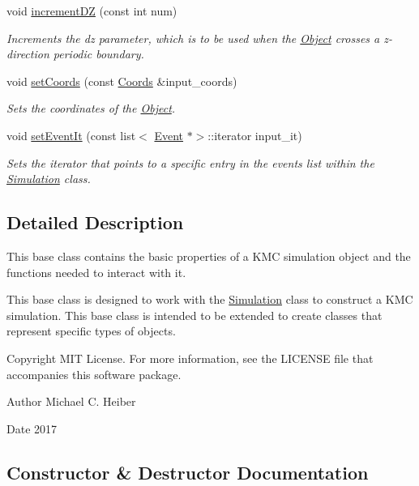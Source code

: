 \begin{DoxyCompactItemize}
void \hyperlink{class_object_a440b267c478f5d63db1954bdbd543408}{increment\+DZ} (const int num)
\begin{DoxyCompactList}\small\item\em Increments the dz parameter, which is to be used when the \hyperlink{class_object}{Object} crosses a z-\/direction periodic boundary. \end{DoxyCompactList}\item 
void \hyperlink{class_object_a34a164e4709e5daaba7a38c3d61ae617}{set\+Coords} (const \hyperlink{struct_coords}{Coords} \&input\+\_\+coords)
\begin{DoxyCompactList}\small\item\em Sets the coordinates of the \hyperlink{class_object}{Object}. \end{DoxyCompactList}\item 
void \hyperlink{class_object_ae39c4b0bd4e6a5f07f3d0e07e32061ec}{set\+Event\+It} (const list$<$ \hyperlink{class_event}{Event} $\ast$$>$\+::iterator input\+\_\+it)
\begin{DoxyCompactList}\small\item\em Sets the iterator that points to a specific entry in the events list within the \hyperlink{class_simulation}{Simulation} class. \end{DoxyCompactList}\end{DoxyCompactItemize}


\subsection{Detailed Description}
This base class contains the basic properties of a K\+MC simulation object and the functions needed to interact with it. 

This base class is designed to work with the \hyperlink{class_simulation}{Simulation} class to construct a K\+MC simulation. This base class is intended to be extended to create classes that represent specific types of objects. \begin{DoxyCopyright}{Copyright}
M\+IT License. For more information, see the L\+I\+C\+E\+N\+SE file that accompanies this software package. 
\end{DoxyCopyright}
\begin{DoxyAuthor}{Author}
Michael C. Heiber 
\end{DoxyAuthor}
\begin{DoxyDate}{Date}
2017 
\end{DoxyDate}


\subsection{Constructor \& Destructor Documentation}
\mbox{\label{class_object_aff050a622272cc7667251c7315f09fd7}} 
